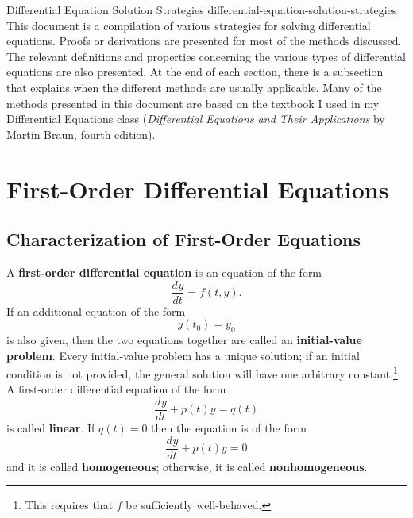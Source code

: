 \documentclass{myart}
\newcommand{\term}[1]{\textbf{#1}}
\newcommand{\deriv}[3][]{\frac{d^{#1}#2}{d#3^{#1}}}
\begin{document}
\titlepage
{Differential Equation Solution Strategies}
{differential-equation-solution-strategies}
{This document is a compilation of various strategies for solving
  differential equations. Proofs or derivations are presented for most
  of the methods discussed. The relevant definitions and properties
  concerning the various types of differential equations are also
  presented. At the end of each section, there is a subsection that
  explains when the different methods are usually applicable. Many of
  the methods presented in this document are based on the textbook I
  used in my Differential Equations class (\textit{Differential
    Equations and Their Applications} by Martin Braun, fourth
  edition).}

\tableofcontents

\section{First-Order Differential Equations}
\label{sec:first order}

\subsection{Characterization of First-Order Equations}
\label{subsec:first order characterization}

A \term{first-order differential equation} is an equation of the form
\begin{equation*}
  \deriv{y}{t} = f(t, y).
\end{equation*}
If an additional equation of the form
\begin{equation*}
  y(t_0) = y_0
\end{equation*}
is also given, then the two equations together are called an
\term{initial-value problem}. Every initial-value problem has a unique
solution; if an initial condition is not provided, the general
solution will have one arbitrary constant.\footnote{This requires that
  $f$ be sufficiently well-behaved.} A first-order differential
equation of the form
\begin{equation} \label{eq:first order nonhomogeneous}
  \deriv{y}{t} + p(t)y = q(t)
\end{equation}
is called \term{linear}. If $q(t) = 0$ then the equation is of the
form
\begin{equation} \label{eq:first order homogeneous}
  \deriv{y}{t} + p(t)y = 0
\end{equation}
and it is called \term{homogeneous}; otherwise, it is called
\term{nonhomogeneous}.
\end{document}
